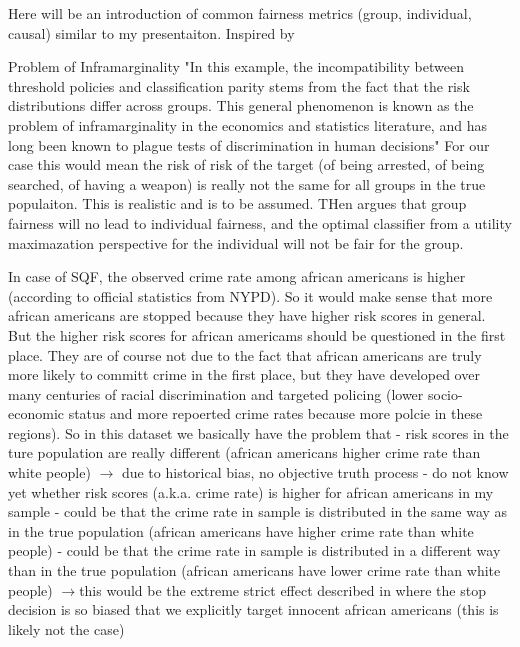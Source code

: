 Here will be an introduction of common fairness metrics (group, individual, causal) similar to my
presentaiton.
Inspired by \cite{verma2018} \cite{caton2024} \cite{castelnovo2022}

Problem of Inframarginality \cite{corbett-davies}
"In this example, the incompatibility between threshold policies and classification parity stems from the fact that
the risk distributions differ across groups. This general phenomenon is known as the problem of inframarginality in
the economics and statistics literature, and has long been known to plague tests of discrimination in human decisions"
For our case this would mean the risk of risk of the target (of being arrested, of being searched, of having a weapon)
is really not the same for all groups in the true populaiton. This is realistic and is to be assumed. THen \cite{corbett-davies}
argues that group fairness will no lead to individual fairness, and the optimal classifier from a utility maximazation perspective
for the individual will not be fair for the group.

In case of SQF, the observed crime rate among african americans is higher (according to official statistics from NYPD).
So it would make sense that more african americans are stopped because they have higher risk scores in general. But the higher risk
scores for african americams should be questioned in the first place. They are of course not due to the fact that african americans
are truly more likely to committ crime in the first place, but they have developed over many centuries of racial discrimination
and targeted policing (lower socio-economic status and more repoerted crime rates because more polcie in these regions).
So in this dataset we basically have the problem that
- risk scores in the ture population are really different (african americans higher crime rate than white people) $\rightarrow$ due to historical bias, no objective truth process
- do not know yet whether risk scores (a.k.a. crime rate) is higher for african americans in my sample
- could be that the crime rate in sample is distributed in the same way as in the true population (african americans have higher crime rate than white people)
- could be that the crime rate in sample is distributed in a different way than in the true population (african americans have lower crime rate than white people)
$\rightarrow$this would be the extreme strict effect described in \cite{kallus} where the stop decision is so
biased that we explicitly target innocent african americans (this is likely not the case)


